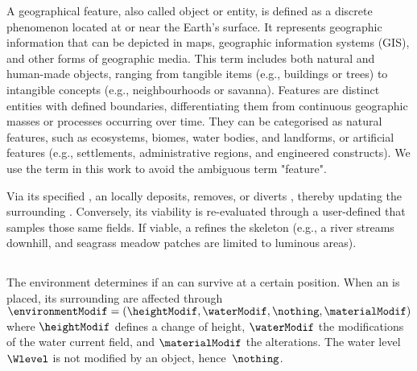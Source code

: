 A geographical feature, also called object or entity, is defined as a discrete phenomenon located at or near the Earth's surface. It represents geographic information that can be depicted in maps, geographic information systems (GIS), and other forms of geographic media. This term includes both natural and human-made objects, ranging from tangible items (e.g., buildings or trees) to intangible concepts (e.g., neighbourhoods or savanna). Features are distinct entities with defined boundaries, differentiating them from continuous geographic masses or processes occurring over time. They can be categorised as natural features, such as ecosystems, biomes, water bodies, and landforms, or artificial features (e.g., settlements, administrative regions, and engineered constructs). We use the term  in this work to avoid the ambiguous term "feature".


Via its specified , an  locally deposits, removes, or diverts , thereby updating the surrounding . Conversely, its viability is re-evaluated through a user-defined  that samples those same fields. If viable, a  refines the skeleton (e.g., a river streams downhill, and seagrass meadow patches are limited to luminous areas).

\subsection{}

The environment determines if an  can survive at a certain position.
When an  is placed, its surrounding  are affected through  $\environmentModif = (\heightModif, \waterModif, \nothing, \materialModif)$ where $\heightModif$ defines a change of height, $\waterModif$ the modifications of the water current field, and $\materialModif$ the  alterations. The water level~$\Wlevel$ is not modified by an object, hence~$\nothing$.

